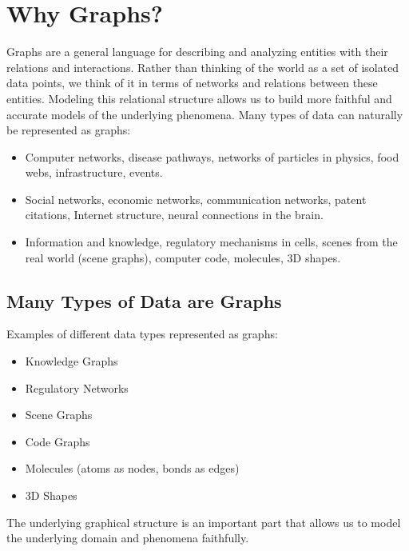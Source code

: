 \documentclass{article}
\begin{document}
\sloppy
\section{Why Graphs?}
Graphs are a general language for describing and analyzing entities with their relations and interactions. Rather than thinking of the world as a set of isolated data points, we think of it in terms of networks and relations between these entities. Modeling this relational structure allows us to build more faithful and accurate models of the underlying phenomena.
Many types of data can naturally be represented as graphs:
\begin{itemize}
    \item Computer networks, disease pathways, networks of particles in physics, food webs, infrastructure, events.
    \item Social networks, economic networks, communication networks, patent citations, Internet structure, neural connections in the brain.
    \item Information and knowledge, regulatory mechanisms in cells, scenes from the real world (scene graphs), computer code, molecules, 3D shapes.
\end{itemize}
\subsection{Many Types of Data are Graphs}
Examples of different data types represented as graphs:
\begin{itemize}
    \item Knowledge Graphs
    \item Regulatory Networks
    \item Scene Graphs
    \item Code Graphs
    \item Molecules (atoms as nodes, bonds as edges)
    \item 3D Shapes
\end{itemize}
The underlying graphical structure is an important part that allows us to model the underlying domain and phenomena faithfully.
\end{document}
